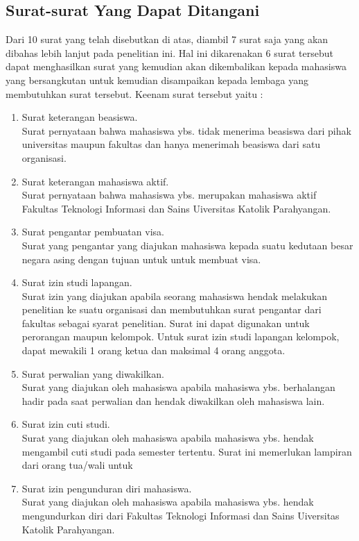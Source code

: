 \subsection{Surat-surat Yang Dapat Ditangani}
\label{sec:surat_yang_ditangani}
Dari 10 surat yang telah disebutkan di atas, diambil 7 surat saja yang akan dibahas lebih lanjut pada penelitian ini. Hal ini dikarenakan 6 surat tersebut dapat menghasilkan surat yang kemudian akan dikembalikan kepada mahasiswa yang bersangkutan untuk kemudian disampaikan kepada lembaga yang membutuhkan surat tersebut. Keenam surat tersebut yaitu :
\begin{enumerate}
	\item Surat keterangan beasiswa. \\
	Surat pernyataan bahwa mahasiswa ybs. tidak menerima beasiswa dari pihak universitas maupun fakultas dan hanya menerimah beasiswa dari satu organisasi.
	\item Surat keterangan mahasiswa aktif. \\
	Surat pernyataan bahwa mahasiswa ybs. merupakan mahasiswa aktif Fakultas Teknologi Informasi dan Sains Uiversitas Katolik Parahyangan.
	\item Surat pengantar pembuatan visa. \\
	Surat yang pengantar yang diajukan mahasiswa kepada suatu kedutaan besar negara asing dengan tujuan untuk untuk membuat visa.
	\item Surat izin studi lapangan. \\
	Surat izin yang diajukan apabila seorang mahasiswa hendak melakukan penelitian ke suatu organisasi dan membutuhkan surat pengantar dari fakultas sebagai syarat penelitian. Surat ini dapat digunakan untuk perorangan maupun kelompok. Untuk surat izin studi lapangan kelompok, dapat mewakili 1 orang ketua dan maksimal 4 orang anggota.
	\item Surat perwalian yang diwakilkan. \\
	Surat yang diajukan oleh mahasiswa apabila mahasiswa ybs. berhalangan hadir pada saat perwalian dan hendak diwakilkan oleh mahasiswa lain. 
	\item Surat izin cuti studi. \\
	Surat yang diajukan oleh mahasiswa apabila mahasiswa ybs. hendak mengambil cuti studi pada semester tertentu. Surat ini memerlukan lampiran dari orang tua/wali untuk
	\item Surat izin pengunduran diri mahasiswa. \\
	Surat yang diajukan oleh mahasiswa apabila mahasiswa ybs. hendak mengundurkan diri dari Fakultas Teknologi Informasi dan Sains Uiversitas Katolik Parahyangan.
\end{enumerate}

